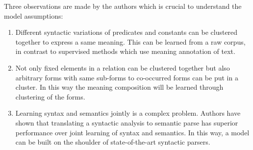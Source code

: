 \documentclass[12pt]{report}
\begin{document}
Three observations are made by the authors which is crucial to understand the model assumptions:

\begin{enumerate}
  \item Different syntactic variations of predicates and constants can be clustered together to express
   a same meaning. This can be learned from a raw corpus, in contrast to supervised methods which use meaning annotation of text.
   \item Not only fixed elements in a relation can be clustered together but also arbitrary forms with same sub-forms to co-occurred forms 
   can be put in a cluster. In this way the meaning composition will be learned through clustering of the forms.
   \item Learning syntax and semantics jointly is a complex problem. Authors have shown that translating a syntactic analysis
   to semantic parse has superior performance over joint learning of syntax and semantics. In this way, a model can be built on the shoulder
   of state-of-the-art syntactic parsers.
   
\end{enumerate}
\end{document}
